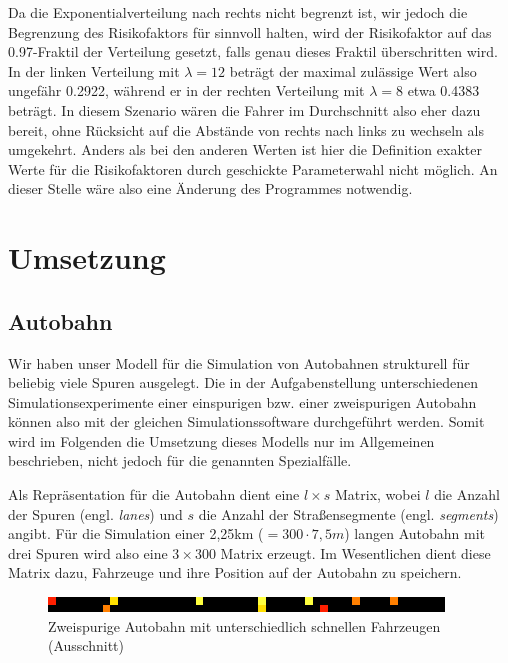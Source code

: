 \documentclass[11pt, a4paper]{article}
\begin{document}
\begin{itemize}
Da die Exponentialverteilung nach rechts nicht begrenzt ist, wir jedoch die Begrenzung des Risikofaktors für sinnvoll halten, wird der Risikofaktor auf das 0.97-Fraktil der Verteilung gesetzt, falls genau dieses Fraktil überschritten wird. In der linken Verteilung mit $\lambda = 12$ beträgt der maximal zulässige Wert also ungefähr 0.2922, während er in der rechten Verteilung mit $\lambda = 8$ etwa 0.4383 beträgt. In diesem Szenario wären die Fahrer im Durchschnitt also eher dazu bereit, ohne Rücksicht auf die Abstände von rechts nach links zu wechseln als umgekehrt. Anders als bei den anderen Werten ist hier die Definition exakter Werte für die Risikofaktoren durch geschickte Parameterwahl nicht möglich. An dieser Stelle wäre also eine Änderung des Programmes notwendig.

\end{itemize}

\newpage
\section{Umsetzung}
\label{sec:umsetzung}

\subsection{Autobahn}
\label{subsec:umsetzung-autobahn}

Wir haben unser Modell für die Simulation von Autobahnen strukturell für beliebig viele Spuren ausgelegt. Die in der Aufgabenstellung unterschiedenen Simulationsexperimente einer einspurigen bzw. einer zweispurigen Autobahn können also mit der gleichen Simulationssoftware durchgeführt werden. Somit wird im Folgenden die Umsetzung dieses Modells nur im Allgemeinen beschrieben, nicht jedoch für die genannten Spezialfälle.

Als Repräsentation für die Autobahn dient eine $l \times s$ Matrix, wobei $l$ die Anzahl der Spuren (engl. \emph{lanes}) und $s$ die Anzahl der Straßensegmente (engl. \emph{segments}) angibt. Für die Simulation einer 2,25km ($= 300 \cdot 7,5m$) langen Autobahn mit drei Spuren wird also eine $3 \times 300$ Matrix erzeugt. Im Wesentlichen dient diese Matrix dazu, Fahrzeuge und ihre Position auf der Autobahn zu speichern.\\

\begin{figure}[h!]
	\centering
	\includegraphics{img/twoLaneRoad}
	\caption{Zweispurige Autobahn mit unterschiedlich schnellen Fahrzeugen (Ausschnitt)}
	\label{fig:twoLaneRoad}
\end{figure}
\end{document}
